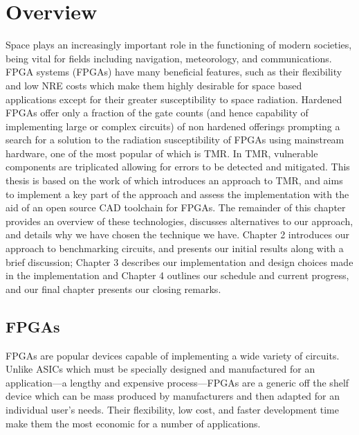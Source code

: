\documentclass[12pt,final,oneside]{memoir} %
\begin{document}
\section{Overview}
Space plays an increasingly important role in the functioning of modern societies, being vital for fields including navigation, meteorology, and communications\cite{OECDSpace}. \acl{FPGA} systems (\acsp{FPGA}) have many beneficial features, such as their flexibility and low \ac{NRE} costs which make them highly desirable for space based applications except for their greater susceptibility to space radiation. Hardened \acp{FPGA} offer only a fraction of the gate counts (and hence capability of implementing large or complex circuits) of non hardened offerings prompting a search for a solution to the radiation susceptibility of \acp{FPGA} using mainstream hardware\cite{VFPGATMR}, one of the most popular of which is \ac{TMR}. In \ac{TMR}, vulnerable components are triplicated allowing for errors to be detected and mitigated. This thesis is based on the work of\cite{DiesselChange} which introduces an approach to \ac{TMR}, and aims to implement a key part of the approach and assess the implementation with the aid of an open source \ac{CAD} toolchain for \acp{FPGA}.
The remainder of this chapter provides an overview of these technologies, discusses alternatives to our approach, and details why we have chosen the technique we have. Chapter 2 introduces our approach to benchmarking circuits, and presents our initial results along with a brief discussion; Chapter 3 describes our implementation and design choices made in the implementation and Chapter 4 outlines our schedule and current progress, and our final chapter presents our closing remarks.
\acresetall
\subsection{\acsp{FPGA}}
\acp{FPGA} are popular devices capable of implementing a wide variety of circuits. Unlike \acp{ASIC} which must be specially designed and manufactured for an application---a lengthy and expensive process---\acp{FPGA} are a generic off the shelf device which can be mass produced by manufacturers and then adapted for an individual user's needs. Their flexibility, low cost, and faster development time make them the most economic for a number of applications.
\end{document}
